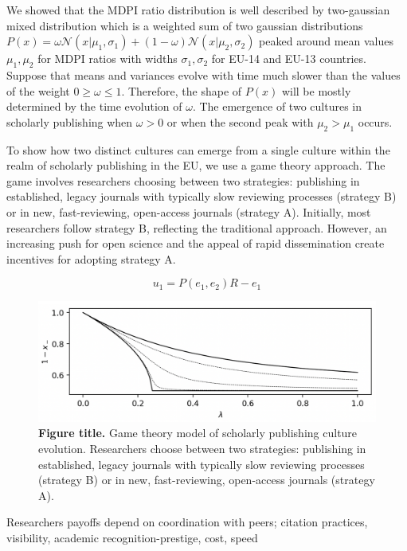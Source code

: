 \documentclass[amsfonts, amssymb, prl, superscriptaddress, notitlepage, twocolumn, nofootinbib]{revtex4-2}
\begin{document}
We showed that the MDPI ratio distribution is well described by two-gaussian mixed distribution which is a weighted sum of two gaussian distributions $P(x) = \omega\mathcal{N}(x|\mu_1, \sigma_1) + (1-\omega)\mathcal{N}(x|\mu_2, \sigma_2)$ peaked around mean values $\mu_1, \mu_2$ for MDPI ratios with widths $\sigma_1, \sigma_2$ for EU-14 and EU-13 countries. Suppose that means and variances evolve with time much slower than the values of the weight $0\ge\omega\le 1$.  Therefore, the shape of $P(x)$ will be mostly determined by the time evolution of $\omega$. The emergence of two cultures in scholarly publishing when $\omega > 0$ or when the second peak with $\mu_2 >\mu_1$ occurs.  

To show how two distinct cultures can emerge from a single culture within the realm of scholarly publishing in the EU, we use a game theory approach. The game involves researchers choosing between two strategies: publishing in established, legacy journals with typically slow reviewing processes (strategy B) or in new, fast-reviewing, open-access journals (strategy A). Initially, most researchers follow strategy B, reflecting the traditional approach. However, an increasing push for open science and the appeal of rapid dissemination create incentives for adopting strategy A. 

\begin{equation}
    u_1 = P(e_1, e_2)R - e_1
\end{equation}

\begin{figure}
    \centering
    \includegraphics[width=1.0\linewidth]{Fig07.png}
    \caption{\label{fig:fig7} {\bf Figure title.} Game theory model of scholarly publishing culture evolution. Researchers choose between two strategies: publishing in established, legacy journals with typically slow reviewing processes (strategy B) or in new, fast-reviewing, open-access journals (strategy A). 
}
\end{figure}

Researchers payoffs depend on coordination with peers; citation practices, visibility, academic recognition-prestige, cost, speed  
\end{document}
